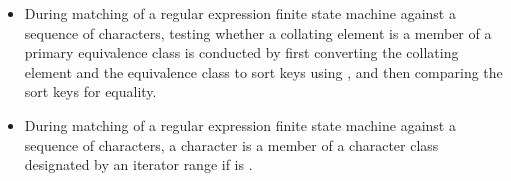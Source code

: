 \begin{itemize}
\item During matching of a regular expression finite state machine against a sequence of
characters, testing whether a collating element is a member of a primary equivalence
class is conducted by first converting the collating element and the equivalence
class to sort keys using , and then comparing the sort
keys for equality.
%
%

\item During matching of a regular expression finite state machine against a sequence
of characters, a character  is a member of a character class designated by an
iterator range  if
 is .
\end{itemize}
